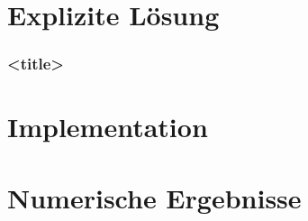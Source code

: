 \documentclass{beamer}
\begin{document}
\section{Explizite Lösung}

\begin{frame}
    \frametitle{<title>}

    

\end{frame}

%    




\section{Implementation}

%    



\section{Numerische Ergebnisse}
\end{document}
